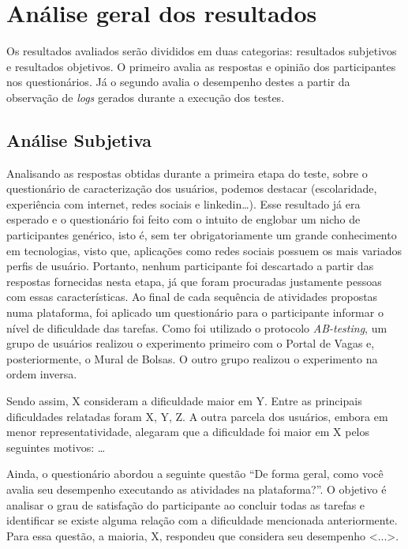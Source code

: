\documentclass[cic,tc]{iiufrgs}
\begin{document}
\section{Análise geral dos resultados}
\label{avaliacaoAnalise}

Os resultados avaliados serão divididos em duas categorias: resultados subjetivos e resultados objetivos. O primeiro avalia as respostas e opinião dos participantes nos questionários. Já o segundo avalia o desempenho destes a partir da observação de \textit{logs} gerados durante a execução dos testes.


\subsection{Análise Subjetiva}
\label {avaliacaoAnaliseSubjetiva}

Analisando as respostas obtidas durante a primeira etapa do teste, sobre o questionário de caracterização dos usuários, podemos destacar (escolaridade, experiência com internet, redes sociais e linkedin…). Esse resultado já era esperado e o questionário foi feito com o intuito de englobar um nicho de participantes genérico, isto é, sem ter obrigatoriamente um grande conhecimento em tecnologias, visto que, aplicações como redes sociais possuem os mais variados perfis de usuário. Portanto, nenhum participante foi descartado a partir das respostas fornecidas nesta etapa, já que foram procuradas justamente pessoas com essas características.
Ao final de cada sequência de atividades propostas numa plataforma, foi aplicado um questionário para o participante informar o nível de dificuldade das tarefas. Como foi utilizado o protocolo \textit{AB-testing}, um grupo de usuários realizou o experimento primeiro com o Portal de Vagas e, posteriormente, o Mural de Bolsas. O outro grupo realizou o experimento na ordem inversa. 

Sendo assim, X consideram a dificuldade maior em Y. Entre as principais dificuldades relatadas foram X, Y, Z. A outra parcela dos usuários, embora em menor representatividade, alegaram que a dificuldade foi maior em X pelos seguintes motivos: …

Ainda, o questionário abordou a seguinte questão “De forma geral, como você avalia seu desempenho executando as atividades na plataforma?”. O objetivo é analisar o grau de satisfação do participante ao concluir todas as tarefas e identificar se existe alguma relação com a dificuldade mencionada anteriormente. Para essa questão, a maioria, X, respondeu que considera seu desempenho <...>.
\end{document}

